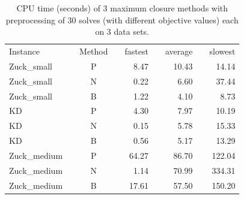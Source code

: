 \documentclass[authoryear,11pt,square,number,times,super,comma]{elsarticle}
\begin{document}
\begin{table}[!htb]
\centering
\caption{CPU time (seconds) of 3 maximum closure methods with preprocessing of 30 solves (with different objective values) each on 3 data sets.}
\label{tab:MC}
\begin{tabular}{lccrrrrrr}
\toprule
Instance	&&	Method	&&	fastest	&&	average	&&	slowest \\
\cmidrule{1-1}\cmidrule{3-3}\cmidrule{5-5}\cmidrule{7-7}\cmidrule{9-9}
Zuck\_small && P &&   8.47 &&  10.43 &&  14.14\\
Zuck\_small && N &&   0.22 &&   6.60 &&  37.44\\
Zuck\_small && B &&   1.22 &&   4.10 &&   8.73\\
KD         && P &&   4.30 &&   7.97 &&  10.19\\
KD         && N &&   0.15 &&   5.78 &&  15.33\\
KD         && B &&   0.56 &&   5.17 &&  13.29\\
Zuck\_medium&& P &&  64.27 &&  86.70 && 122.04\\
Zuck\_medium&& N &&   1.14 &&  70.99 && 334.31\\
Zuck\_medium&& B &&  17.61 &&  57.50 && 150.20\\
\bottomrule
\end{tabular}
\end{table}
\end{document}

